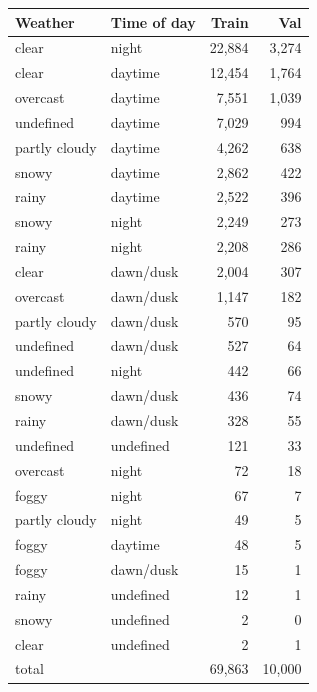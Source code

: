 \begin{tabular}{llrr}
\toprule
Weather & Time of day & Train & Val \\
\midrule
clear & night & 22,884 & 3,274 \\
clear & daytime & 12,454 & 1,764 \\
overcast & daytime & 7,551 & 1,039 \\
undefined & daytime & 7,029 & 994 \\
partly cloudy & daytime & 4,262 & 638 \\
snowy & daytime & 2,862 & 422 \\
rainy & daytime & 2,522 & 396 \\
snowy & night & 2,249 & 273 \\
rainy & night & 2,208 & 286 \\
clear & dawn/dusk & 2,004 & 307 \\
overcast & dawn/dusk & 1,147 & 182 \\
partly cloudy & dawn/dusk & 570 & 95 \\
undefined & dawn/dusk & 527 & 64 \\
undefined & night & 442 & 66 \\
snowy & dawn/dusk & 436 & 74 \\
rainy & dawn/dusk & 328 & 55 \\
undefined & undefined & 121 & 33 \\
overcast & night & 72 & 18 \\
foggy & night & 67 & 7 \\
partly cloudy & night & 49 & 5 \\
foggy & daytime & 48 & 5 \\
foggy & dawn/dusk & 15 & 1 \\
rainy & undefined & 12 & 1 \\
snowy & undefined & 2 & 0 \\
clear & undefined & 2 & 1 \\
total &  & 69,863 & 10,000 \\
\bottomrule
\end{tabular}
